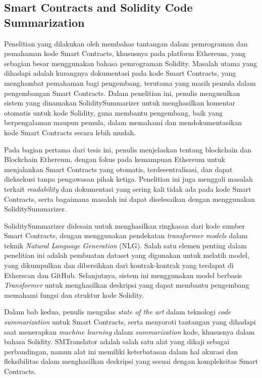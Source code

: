 \subsection{Smart Contracts and Solidity Code Summarization}
\label{subsec:smart-contract-solidity-summary}

Penelitian yang dilakukan oleh \cite{zhang2021smart} membahas tantangan dalam pemrograman dan pemahaman kode Smart Contracts, khususnya pada platform Ethereum, yang sebagian besar menggunakan bahasa pemrograman Solidity. Masalah utama yang dihadapi adalah kurangnya dokumentasi pada kode Smart Contracts, yang menghambat pemahaman bagi pengembang, terutama yang masih pemula dalam pengembangan Smart Contracts. Dalam penelitian ini, penulis mengusulkan sistem yang dinamakan SoliditySummarizer untuk menghasilkan komentar otomatis untuk kode Solidity, guna membantu pengembang, baik yang berpengalaman maupun pemula, dalam memahami dan mendokumentasikan kode Smart Contracts secara lebih mudah.

Pada bagian pertama dari tesis ini, penulis menjelaskan tentang blockchain dan Blockchain Ethereum, dengan fokus pada kemampuan Ethereum untuk menjalankan Smart Contracts yang otomatis, terdesentralisasi, dan dapat dieksekusi tanpa pengawasan pihak ketiga. Penelitian ini juga menggali masalah terkait \textit{readability} dan dokumentasi yang sering kali tidak ada pada kode Smart Contracts, serta bagaimana masalah ini dapat diselesaikan dengan menggunakan SoliditySummarizer.

SoliditySummarizer didesain untuk menghasilkan ringkasan dari kode sumber Smart Contracts, dengan menggunakan pendekatan \textit{transformer models} dalam teknik \textit{Natural Language Generation} (NLG). Salah satu elemen penting dalam penelitian ini adalah pembuatan dataset yang digunakan untuk melatih model, yang dikumpulkan dan dibersihkan dari kontrak-kontrak yang terdapat di Etherscan dan GitHub. Selanjutnya, sistem ini menggunakan model berbasis \textit{Transformer} untuk menghasilkan deskripsi yang dapat membantu pengembang memahami fungsi dan struktur kode Solidity.

Dalam bab kedua, penulis mengulas \textit{state of the art} dalam teknologi \textit{code summarization} untuk Smart Contracts, serta menyoroti tantangan yang dihadapi saat menerapkan \textit{machine learning} dalam \textit{summarization} kode, khususnya dalam bahasa Solidity. SMTranslator adalah salah satu alat yang dikaji sebagai perbandingan, namun alat ini memiliki keterbatasan dalam hal akurasi dan fleksibilitas dalam menghasilkan deskripsi yang sesuai dengan kompleksitas Smart Contracts.

